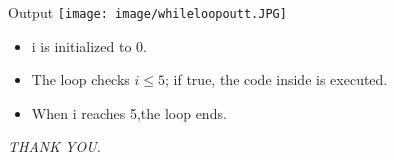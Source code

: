 \documentclass{beamer}
\begin{document}
\begin{frame}{Output}
    \texttt{[image: image/whileloopoutt.JPG]}
    \begin{itemize}
        \item {i} is initialized to 0.
       \item The loop checks \( i \leq 5 \); if true, the code inside is executed.
        \item When {i} reaches 5,the loop ends.
    \end{itemize}
\end{frame}
\begin{frame}
\textit{THANK YOU.}
    
\end{frame}
\end{document}
